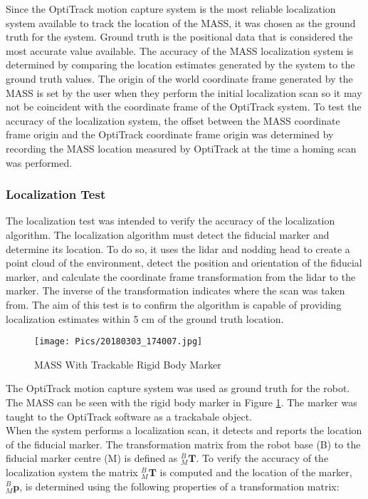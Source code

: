 Since the OptiTrack motion capture system is the most reliable localization system available to track the location of the MASS, it was chosen as the ground truth for the system. Ground truth is the positional data that is considered the most accurate value available. The accuracy of the MASS localization system is determined by comparing the location estimates generated by the system to the ground truth values. The origin of the world coordinate frame generated by the MASS is set by the user when they perform the initial localization scan so it may not be coincident with the coordinate frame of the OptiTrack system. To test the accuracy of the localization system, the offset between the MASS coordinate frame origin and the OptiTrack coordinate frame origin was determined by recording the MASS location measured by OptiTrack at the time a homing scan was performed.\\

\subsubsection{Localization Test}

The localization test was intended to verify the accuracy of the localization algorithm. The localization algorithm must detect the fiducial marker and determine its location. To do so, it uses the \acrshort{lidar} and nodding head to create a point cloud of the environment, detect the position and orientation of the fiducial marker, and calculate the coordinate frame transformation from the \acrshort{lidar} to the marker. The inverse of the transformation indicates where the scan was taken from. The aim of this test is to confirm the algorithm is capable of providing localization estimates within 5 cm of the ground truth location.\\

\begin{figure}
    \centering
    \texttt{[image: Pics/20180303\_174007.jpg]}
    \caption{MASS With Trackable Rigid Body Marker}
    \label{fig:rigidbody}
\end{figure}

The OptiTrack motion capture system was used as ground truth for the robot. The MASS can be seen with the rigid body marker in Figure \ref{fig:rigidbody}. The marker was taught to the OptiTrack software as a trackabale object.\\

When the system performs a localization scan, it detects and reports the location of the fiducial marker. The transformation matrix from the robot base (B) to the fiducial marker centre (M) is defined as $^B_M\mathbf{T}$. To verify the accuracy of the localization system the matrix $^B_{M}\mathbf{T}$ is computed and the location of the marker, $^B_{M}\mathbf{p}$, is determined using the following properties of a transformation matrix:\\


